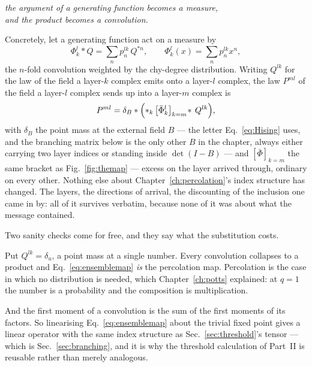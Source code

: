 \begin{center}
\emph{the argument of a generating function becomes a measure,\\
and the product becomes a convolution.}
\end{center}

Concretely, let a generating function act on a measure by
\begin{equation}
  \Phi^{l}_{k}\ast Q=\sum_{n}p^{lk}_{n}\,Q^{\ast n},
  \qquad
  \Phi^{l}_{k}(x)=\sum_{n}p^{lk}_{n}x^{n},
  \label{eq:conv}
\end{equation}
the $n$-fold convolution weighted by the chy-degree distribution. Writing
$Q^{lk}$ for the law of the field a layer-$k$ complex emits onto a layer-$l$
complex, the law $P^{ml}$ of the field a layer-$l$ complex sends up into a
layer-$m$ complex is
\begin{equation}
  P^{ml}=\delta_{B}\ast\Bigl(\ast_{k}\,
    \bigl[\bar\Phi^{l}_{k}\bigr]_{k=m}\!\ast\,Q^{lk}\Bigr),
  \label{eq:ensemblemap}
\end{equation}
with $\delta_{B}$ the point mass at the external field $B$ --- the letter
Eq.~\eqref{eq:Hising} uses, and the branching matrix below is the only other
$B$ in the chapter, always either carrying two layer indices or standing inside
$\det(I-B)$ --- and
$[\bar\Phi]_{k=m}$ the same bracket as Fig.~\ref{fig:themap} --- excess on the
layer arrived through, ordinary on every other. Nothing else about
Chapter~\ref{ch:percolation}'s index structure has changed. The layers, the
directions of arrival, the discounting of the inclusion one came in by: all of
it survives verbatim, because none of it was about what the message contained.

Two sanity checks come for free, and they say what the substitution costs.

Put $Q^{lk}=\delta_{u}$, a point mass at a single number. Every convolution
collapses to a product and Eq.~\eqref{eq:ensemblemap} \emph{is} the percolation
map. Percolation is the case in which no distribution is needed, which
Chapter~\ref{ch:potts} explained: at $q=1$ the number is a probability and the
composition is multiplication.

And the first moment of a convolution is the sum of the first moments of its
factors. So linearising Eq.~\eqref{eq:ensemblemap} about the trivial fixed
point gives a linear operator with the same index structure as
Sec.~\ref{sec:threshold}'s tensor --- which is Sec.~\ref{sec:branching}, and it
is why the threshold calculation of Part~II is reusable rather than merely
analogous.

